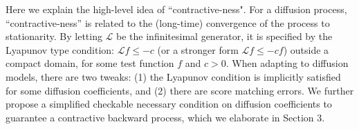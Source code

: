 \documentclass[letterpaper,10pt,reqno]{amsart}
\numberwithin{equation}{section}
\begin{document}
\quad Here we explain the high-level idea of ``contractive-ness". 
For a diffusion process, ``contractive-ness'' is related to the (long-time) convergence of the process to stationarity. By letting $\mathcal{L}$ be the infinitesimal generator, it is specified by the Lyapunov type condition:
$
\mathcal{L} f \leq-c
$ (or a stronger form $\mathcal{L} f \leq-c f$) outside a compact domain, for some test function $f$ and $c>0$. When adapting to diffusion models, there are two tweaks:
(1) the Lyapunov condition is implicitly satisfied for some diffusion coefficients, and (2) there are score matching errors. 
We further propose a simplified checkable necessary condition on diffusion coefficients to guarantee a contractive backward process, which we elaborate in Section 3.
\end{document}
